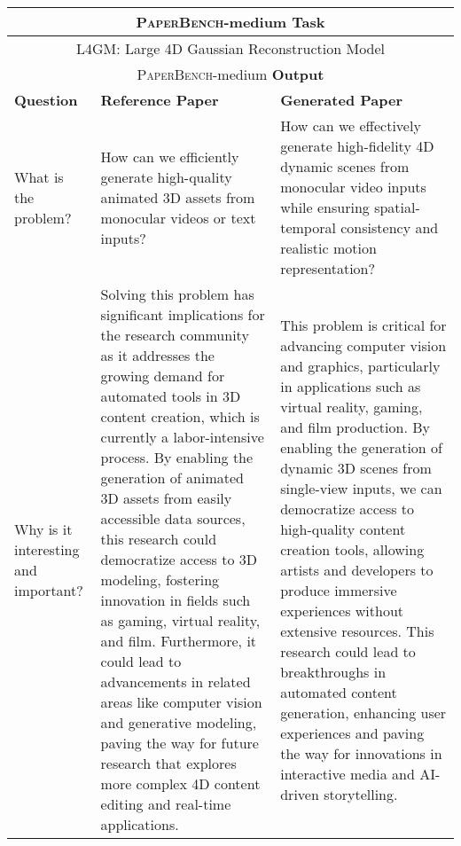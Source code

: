 \begin{table*}[htbp]
\centering
\scriptsize
\begin{tabular}{p{3cm}p{6cm}p{6cm}}
\toprule[1.1pt]
\multicolumn{3}{c}{\textsc{PaperBench}-medium \textbf{Task}} \\ \midrule
\multicolumn{3}{c}{L4GM: Large 4D Gaussian Reconstruction Model} \\ \midrule
\multicolumn{3}{c}{\textsc{PaperBench}-medium \textbf{Output}} \\ \midrule
\textbf{Question} & \textbf{Reference Paper} & \textbf{Generated Paper} \\ \midrule
What is the problem? & 
How can we efficiently generate high-quality animated 3D assets from monocular videos or text inputs? &
How can we effectively generate high-fidelity 4D dynamic scenes from monocular video inputs while ensuring spatial-temporal consistency and realistic motion representation? \\ \midrule

Why is it interesting and important? & 
Solving this problem has significant implications for the research community as it addresses the growing demand for automated tools in 3D content creation, which is currently a labor-intensive process. By enabling the generation of animated 3D assets from easily accessible data sources, this research could democratize access to 3D modeling, fostering innovation in fields such as gaming, virtual reality, and film. Furthermore, it could lead to advancements in related areas like computer vision and generative modeling, paving the way for future research that explores more complex 4D content editing and real-time applications. &
This problem is critical for advancing computer vision and graphics, particularly in applications such as virtual reality, gaming, and film production. By enabling the generation of dynamic 3D scenes from single-view inputs, we can democratize access to high-quality content creation tools, allowing artists and developers to produce immersive experiences without extensive resources. This research could lead to breakthroughs in automated content generation, enhancing user experiences and paving the way for innovations in interactive media and AI-driven storytelling.
\\ \midrule


\end{tabular}
\end{table*}
